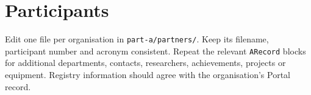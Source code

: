 \clearpage
\section{Participants}
\begin{heguidance}
Edit one file per organisation in \texttt{part-a/partners/}. Keep its filename, participant
number and acronym consistent. Repeat the relevant \texttt{ARecord} blocks for
additional departments, contacts, researchers, achievements, projects or equipment.
Registry information should agree with the organisation's Portal record.
\end{heguidance}
\HEPrintPartners

